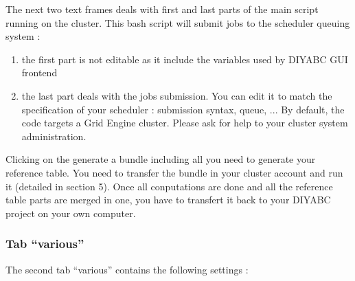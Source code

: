 The next two text frames deals with first and last parts of the main script running on the cluster. This bash script will submit jobs to the scheduler queuing system :
\begin{enumerate}
 \item the first part is not editable as it include the variables used by DIYABC GUI frontend
 \item the last part deals with the jobs submission. You can edit it to match the specification of your scheduler : submission syntax, queue, ... By default, the code targets a Grid Engine cluster. Please ask for help to your cluster system administration.
\end{enumerate}


Clicking on the  generate a bundle including all you need to generate your reference table. You need to transfer the bundle in your cluster account and run it (detailed in section 5). Once all conputations are done and all the reference table parts are merged in one, you have to transfert it back to your DIYABC project on your own computer.


\subsubsection{Tab \textsf{``various''}}
The second tab \textsf{``various''} contains the following settings :

